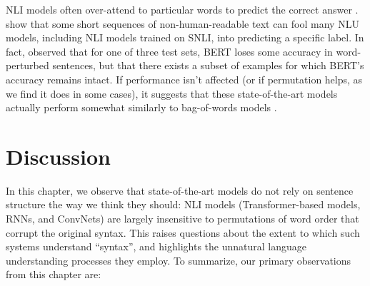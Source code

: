\documentclass[letterpaper, 12pt]{report}
\begin{document}
NLI models often over-attend to particular words to predict the correct answer \citep{gururangan-etal-2018-annotation, clark-etal-2019-bert}. \cite{wallace-etal-2019-universal} show that some short sequences of non-human-readable text can fool many NLU models, including NLI models trained on SNLI, into predicting a specific label. In fact, \cite{ettinger-2020-whatbertisnot} observed that for one of three test sets, BERT loses some accuracy in word-perturbed sentences, but that there exists a subset of examples for which BERT’s accuracy remains intact.
If performance isn't affected (or if permutation helps, as we find it does in some cases), it suggests that these state-of-the-art models actually perform somewhat similarly to bag-of-words models \cite{blei-etal-2003-latent, mikolov2013efficient}.




\section{Discussion}
\label{sec:unli_discussion}

In this chapter, we observe that state-of-the-art models do not rely on sentence structure the way we think they should: NLI models (Transformer-based models, RNNs, and ConvNets) are largely insensitive to permutations of word order that corrupt the original syntax. This raises questions about the extent to which such systems understand ``syntax'', and highlights the unnatural language understanding processes they employ. To summarize, our primary observations from this chapter are:
\end{document}
